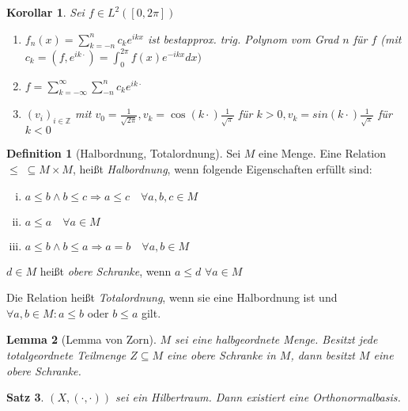 \documentclass[ngerman]{report}
\theoremstyle{plain}%
\newtheorem{thm}{Satz}[chapter]
\newtheorem{lemma}[thm]{Lemma}
\newtheorem*{cor*}{Korollar}
\theoremstyle{definition}%
\newtheorem{definition}[thm]{Definition}
\theoremstyle{myStyle}
\newcommand{\Z}{\mathbb{Z}}
\newcommand{\df}[1][]{%
	\overset{#1}{\Rightarrow}
}
\newcommand{\ff}[3]{(#1_#2)_{#2\in#3}}
\begin{document}
	\begin{cor*}
Sei $f\in L^2([0,2\pi])$
		\begin{enumerate}
			\item $f_n(x) = \sum_{k=-n}^n c_k e^{ikx}$ ist bestapprox. trig. Polynom vom Grad $n$ für $f$ (mit $c_k = (f,e^{ik\cdot })=\int_{0}^{2\pi} f(x) e^{-ikx} dx)$ 
			\item $f = \sum_{k= -\infty}^{\infty} \sum_{-n}^n c_k e^{ik\cdot} $
			\item $\ff{v}{i}{\Z}$ mit $v_0 = \frac{1}{\sqrt{2\pi}}, v_k = \cos(k\cdot) \frac{1}{\sqrt{\pi}} $ für $ k>0, v_k = sin(k\cdot) \frac{1}{\sqrt{\pi}} $ für $k< 0$
		\end{enumerate}
	\end{cor*}

	\begin{definition}[Halbordnung, Totalordnung]
		Sei $M$ eine Menge. Eine Relation $\leq\; \subseteq M\times M$, heißt \textit{Halbordnung}, wenn folgende Eigenschaften erfüllt sind:

			\begin{enumerate}[(i)]
				\item $a\leq b \land b\leq c \df a \leq c\quad \forall a,b,c \in M$
				\item $ a \leq a \quad\forall a\in M$
				\item $ a \leq b \land b\leq a \df a = b\quad \forall a,b\in M$
			\end{enumerate}
		

			\item $d \in M$ heißt \textit{obere Schranke}, wenn $a \leq d$ $\forall a\in M$%
			\item Die Relation heißt \textit{Totalordnung}, wenn sie eine Halbordnung ist und $\forall a,b \in M: a \leq b$ oder $b \leq a$ gilt.

	\end{definition}

	\begin{lemma}[Lemma von Zorn]
		$M$ sei eine halbgeordnete Menge. Besitzt jede totalgeordnete Teilmenge $Z \subseteq M$ eine obere Schranke in $M$, dann besitzt $M$ eine obere Schranke.	
	\end{lemma}

	\begin{thm}
		$(X, (\cdot,\cdot))$ sei ein Hilbertraum. Dann existiert eine Orthonormalbasis.
	\end{thm}
\end{document}
